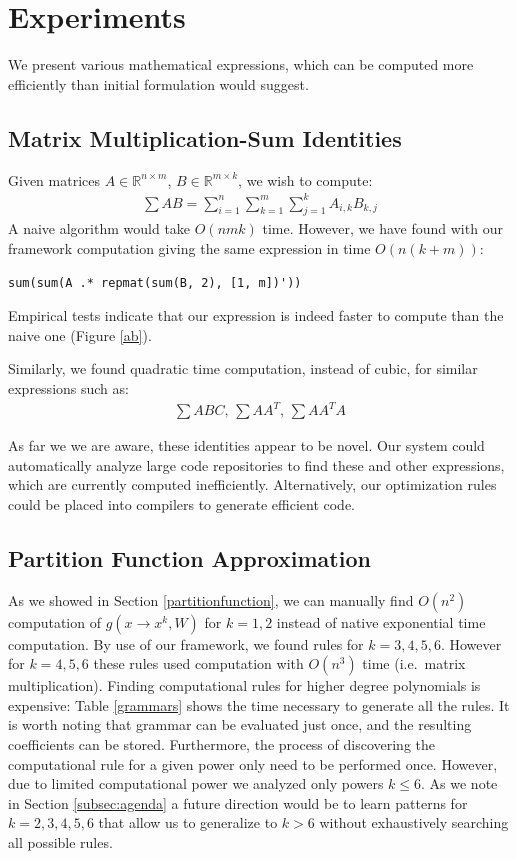\section{Experiments}

We present various mathematical expressions, which can be computed more efficiently
than initial formulation would suggest. 

\subsection{Matrix Multiplication-Sum Identities}

Given matrices $A \in \mathbb{R}^{n \times m}$, $B \in \mathbb{R}^{m
  \times k}$, we wish to compute:
\begin{gather*}
\sum AB = \sum_{i = 1}^n \sum_{k = 1}^m \sum_{j = 1}^k A_{i, k} B_{k, j} 
\end{gather*}
A naive algorithm would take $O(nmk)$ time. However, we have found with our framework 
computation giving the same expression in time $O(n(k + m))$:
\begin{lstlisting}
sum(sum(A .* repmat(sum(B, 2), [1, m])'))
\end{lstlisting}
Empirical tests indicate that our expression is indeed faster to
compute than the naive one (Figure \ref{ab}).

Similarly, we found quadratic time computation, instead of cubic, for
similar expressions such as: 
\begin{align*}
	\sum ABC\text{, }\sum AA^T\text{, }\sum AA^TA
\end{align*}

As far we we are aware, these identities appear to be novel. Our
system could automatically analyze large code repositories to find
these and other expressions, which are currently computed
inefficiently. Alternatively, our optimization rules could be placed
into compilers to generate efficient code.

\subsection{Partition Function Approximation}

As we showed in Section \ref{partitionfunction}, we can manually find
$O(n^2)$ computation of $g(x \rightarrow x^k, W)$ for $k = 1, 2$
instead of native exponential time computation. By use of our
framework, we found rules for $k = 3, 4, 5, 6$. However for $k = 4, 5, 6$
these rules used computation with $O(n^3)$ time (i.e.~matrix
multiplication). Finding computational rules for higher degree
polynomials is expensive: Table \ref{grammars} shows the time
necessary to generate all the rules. It is worth noting that grammar
can be evaluated just once, and the resulting coefficients can be
stored. Furthermore, the process of discovering the computational rule
for a given power only need to be performed once. However, due to limited computational
power we analyzed only powers $k \leq 6$. As we note in Section
\ref{subsec:agenda} a future direction would be to learn patterns for
$k=2, 3, 4, 5, 6$ that allow us to generalize to $k>6$ without exhaustively
searching all possible rules. 

